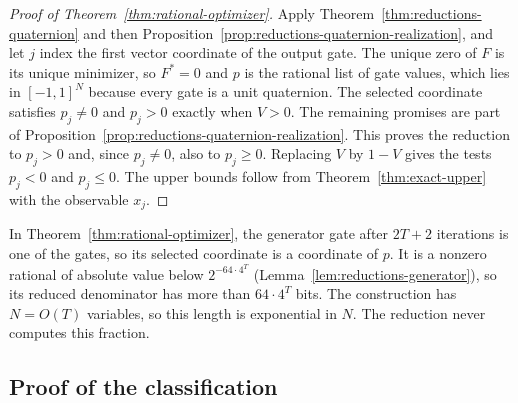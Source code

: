 \begin{proof}[Proof of Theorem~\ref{thm:rational-optimizer}]
Apply Theorem~\ref{thm:reductions-quaternion} and then
Proposition~\ref{prop:reductions-quaternion-realization}, and let $j$ index the
first vector coordinate of the output gate. The unique zero of $F$ is its
unique minimizer, so $F^*=0$ and $p$ is the rational list of gate values,
which lies in $[-1,1]^N$ because every gate is a unit quaternion. The
selected coordinate satisfies $p_j\ne0$ and $p_j>0$ exactly when $V>0$. The
remaining promises are part of
Proposition~\ref{prop:reductions-quaternion-realization}. This proves the
reduction to $p_j>0$ and, since $p_j\ne0$, also to $p_j\ge0$. Replacing $V$ by
$1-V$ gives the tests $p_j<0$ and $p_j\le0$. The upper bounds follow from
Theorem~\ref{thm:exact-upper} with the observable $x_j$.
\end{proof}

\begin{remark}
\label{rem:reductions-rational-length}
In Theorem~\ref{thm:rational-optimizer}, the generator gate after $2T+2$
iterations is one of the gates, so its selected coordinate is a coordinate of
$p$. It is a nonzero rational of absolute value below $2^{-64\cdot4^T}$
(Lemma~\ref{lem:reductions-generator}), so its reduced denominator has more
than $64\cdot4^T$ bits. The construction has $N=O(T)$ variables, so this
length is exponential in $N$. The reduction never computes this fraction.
\end{remark}

\subsection{Proof of the classification}
\label{sec:reductions-proof-main}

